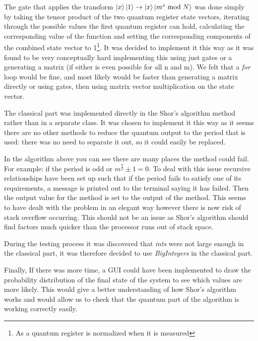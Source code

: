 The gate that applies the transform \( \left| x \right>\left| 1 \right>\rightarrow\left| x \right>\left| m^x \bmod N \right> \)  was done simply by taking  the tensor product of the two quantum register state vectors, iterating through the possible values the first quantum register can hold, calculating the corresponding value of the function and setting the corresponding  components of the combined state vector to 1\footnote{As a quantum register is normalized when it is measured}.  It was decided to implement it this way as it was found to be very conceptually hard implementing this using just gates or a generating a matrix (if either is even possible for all n and m). We felt that a \emph{for} loop would be fine, and most likely would be faster than generating a matrix directly or using gates, then using matrix vector multiplication on the state vector.

The classical part was implemented directly in the Shor's algorithm method rather than in a separate class. It was chosen to implement it this way as it seems there are no other methods to reduce the quantum output to the period that is used: there was no need to separate it out, so it could easily be replaced.

In the algorithm above you can see there are many places the method could fail. For example: if the period is odd or  \( m^ {\frac{p}{2}}\pm1=0 \). To deal with this issue recursive relationships have been set up such that if the period fails to  satisfy one of its requirements, a message is printed out to the terminal saying it has failed. Then the output value for the method is set to the output of the method. This seems to have dealt with the problem in an elegant way however there is now risk of stack overflow occurring. This should not be an issue as Shor’s algorithm should find factors much quicker than the processor runs out of stack space.

During the testing process it was discovered that \emph{ints} were not large enough in the classical part, it was therefore decided to use \emph{BigIntegers} in the classical part.

Finally, If there was more time, a GUI could have been implemented to draw the probability distribution of the final state of the system to see which values are more likely. This would give a better understanding of how Shor's algorithm works and would allow us to check that the quantum part of the algorithm is working correctly easily.
